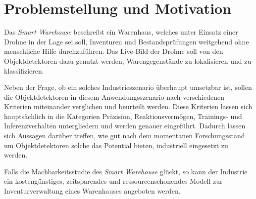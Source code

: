 \section{Problemstellung und Motivation}

Das \textit{Smart Warehouse} beschreibt ein Warenhaus, welches unter Einsatz einer Drohne in der Lage sei soll, Inventuren und Bestandsprüfungen weitgehend ohne menschliche Hilfe durchzuführen. Das Live-Bild der Drohne soll von den Objektdetektoren dazu genutzt werden, Warengegenstände zu lokalisieren und zu klassifizieren. 

Neben der Frage, ob ein solches Industrieszenario überhaupt umsetzbar ist, sollen die Objektdetektoren in diesem Anwendungsszenario nach verschiedenen Kriterien miteinander verglichen und beurteilt werden. Diese Kriterien lassen sich hauptsächlich in die Kategorien Präzision, Reaktionsvermögen, Trainings- und Inferenzverhalten untergliedern und werden genauer eingeführt. Dadurch lassen sich Aussagen darüber treffen, wie gut nach dem momentanen Forschungsstand um Objektdetektoren solche das Potential bieten, industriell eingesetzt zu werden. 

Falls die Machbarkeitsstudie des \textit{Smart Warehouse} glückt, so kann der Industrie ein kostengünstiges, zeitsparendes und ressourcenschonendes Modell zur Inventurverwaltung eines Warenhauses angeboten werden.